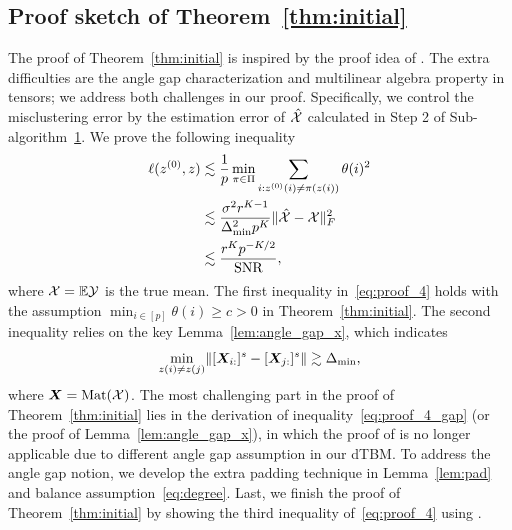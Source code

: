 \documentclass[journal]{IEEEtran}
\theoremstyle{definition}
\theoremstyle{definition}
\begin{document}
\subsection{Proof sketch of Theorem~\ref{thm:initial}}
The proof of Theorem~\ref{thm:initial} is inspired by the proof idea of \cite[Lemma 1]{gao2018community}. The extra difficulties are the angle gap characterization and multilinear algebra property in tensors; we address both challenges in our proof. Specifically, we control the misclustering error by the estimation error of $\hat {\mathcal{X}}$ calculated in Step 2 of Sub-algorithm~\hyperref[alg:main]{1}.  We prove the following inequality
\begin{align}
    \ell(z^{(0)},z) &\lesssim \frac{1}{p}\min_{\pi \in \Pi} \sum_{i: z^{(0)}(i) \neq \pi(z(i))} \theta(i)^2 \\
    &\lesssim \frac{\sigma^2 r^{K-1}}{ \Delta_{\min}^2 p^K} \onormSize{}{\hat \tX - \tX}_F^2 \\
    &\lesssim \frac{r^K p^{-K/2}}{\text{SNR}}, \label{eq:proof_4}
\end{align}
where $\mathcal{X} = \mathbb{E} \mathcal{Y}$ is the true mean. The first inequality in~\eqref{eq:proof_4} holds with the assumption $\min_{i \in [p]} \theta(i) \geq c>0$ in Theorem~\ref{thm:initial}. 
{The second inequality relies on the key Lemma~\ref{lem:angle_gap_x}, which indicates}
\begin{equation}\label{eq:proof_4_gap}
\min_{z(i) \neq z(j)} \onormSize{}{[\mX_{i:}]^s - [\mX_{j:}]^s} \gtrsim \Delta_{\min},
\end{equation}
where $\bm X = \text{Mat}(\mathcal{X})$. The most challenging part in the proof of Theorem~\ref{thm:initial} lies in the derivation of inequality~\eqref{eq:proof_4_gap} (or the proof of Lemma~\ref{lem:angle_gap_x}), in which the proof of \cite{gao2018community} is no longer applicable due to different angle gap assumption in our dTBM. To address the angle gap notion, we develop the extra padding technique in Lemma~\ref{lem:pad} and balance assumption~\eqref{eq:degree}. Last, we finish the proof of Theorem~\ref{thm:initial} by showing the third inequality of~\eqref{eq:proof_4} using \cite[Proposition 1]{han2020exact}. 
\end{document}
